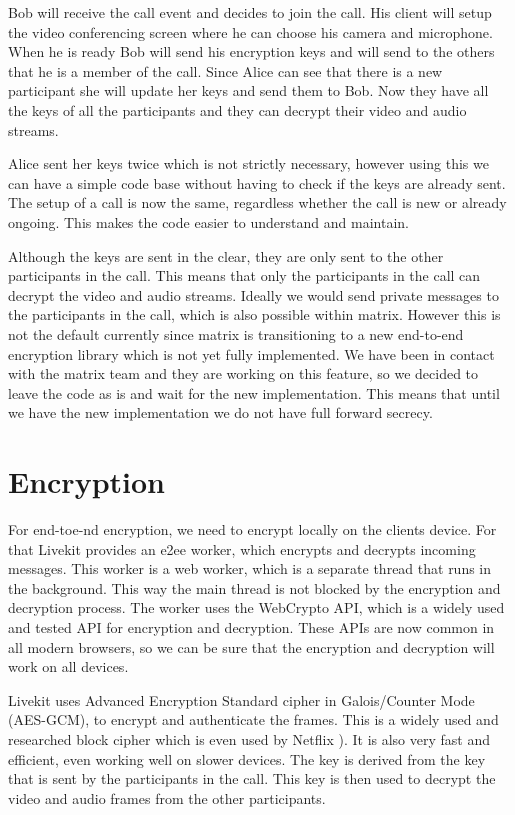 \documentclass{report}
\begin{document}
Bob will receive the call event and decides to join the call. His client will setup the video conferencing
screen where he can choose his camera and microphone. When he is ready Bob will send his encryption keys and will
send to the others that he is a member of the call. Since Alice can see that there is a new participant she will
update her keys and send them to Bob. Now they have all the keys of all the participants and they can decrypt their
video and audio streams.

Alice sent her keys twice which is not strictly necessary, however using this we can have a simple code base
without having to check if the keys are already sent. The setup of a call is now the same, regardless whether
the call is new or already ongoing. This makes the code easier to understand and maintain.

Although the keys are sent in the clear, they are only sent to the other participants in the call. This means that
only the participants in the call can decrypt the video and audio streams. Ideally we would send private
messages to the participants in the call, which is also possible within matrix. However this is not the default
currently since matrix is transitioning to a new end-to-end encryption library which is not yet fully implemented.
We have been in contact with the matrix team and they are working on this feature, so we decided to leave the code
as is and wait for the new implementation. This means that until we have the new implementation we do not have
full forward secrecy.


\section{Encryption}
For end-toe-nd encryption, we need to encrypt locally on the clients device. For that Livekit provides an e2ee worker,
which encrypts and decrypts incoming messages. This worker is a web worker, which is a separate
thread that runs in the background. This way the main thread is not blocked by the encryption and decryption
process. The worker uses the WebCrypto API, which is a widely used and tested API for encryption and decryption.
These APIs are now common in all modern browsers, so we can be sure that the encryption and decryption will work on
all devices.

Livekit uses Advanced Encryption Standard cipher in Galois/Counter Mode (AES-GCM), to encrypt and authenticate the
frames. This is a widely used and researched block cipher which is even used by Netflix
). It is also very fast and efficient, even working well on slower devices. The key is derived from the key that is
sent by the participants in the call. This key is then used to decrypt the video and audio frames from the other
participants.
\end{document}
